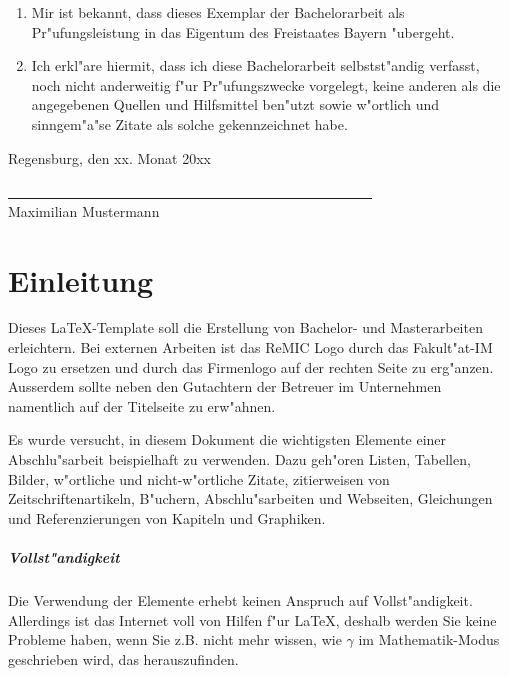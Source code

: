 \documentclass[12pt,a4paper,headinclude,twoside, plainheadsepline, open=right,numbers=noenddot]{scrreprt}
\begin{document}
\begin{enumerate}
\item Mir ist bekannt, dass dieses Exemplar der Bachelorarbeit als Pr"ufungsleistung in das Eigentum des Freistaates Bayern "ubergeht.
\item Ich erkl"are hiermit, dass ich diese Bachelorarbeit selbstst"andig verfasst, noch nicht anderweitig f"ur Pr"ufungszwecke vorgelegt, keine anderen als die angegebenen Quellen und Hilfsmittel ben"utzt sowie w"ortlich und sinngem"a"se Zitate als solche gekennzeichnet habe.
\end{enumerate}
\vspace{1cm}
Regensburg, den xx. Monat 20xx\\
\medskip
\medskip

\underline{~~~~~~~~~~~~~~~~~~~~~~~~~~~~~~~~~~~~~~~~~~~~~~~~~~~~}\\
Maximilian Mustermann\\




\pagestyle{useheadings} %

\tableofcontents %


\chapter{Einleitung}
\label{einleitung}

Dieses \LaTeX-Template soll die Erstellung von Bachelor- und Masterarbeiten erleichtern.
Bei externen Arbeiten ist das ReMIC Logo durch das Fakult"at-IM Logo zu ersetzen und durch das Firmenlogo auf der rechten Seite zu erg"anzen.
Ausserdem sollte neben den Gutachtern der Betreuer im Unternehmen namentlich auf der Titelseite zu erw"ahnen.

Es wurde versucht, in diesem Dokument die wichtigsten Elemente einer Abschlu"sarbeit beispielhaft zu verwenden.
Dazu geh"oren Listen, Tabellen, Bilder, w"ortliche und nicht-w"ortliche Zitate, zitierweisen von Zeitschriftenartikeln, B"uchern, Abschlu"sarbeiten und Webseiten, Gleichungen und Referenzierungen von Kapiteln und Graphiken.

\paragraph{Vollst"andigkeit}
Die Verwendung der Elemente erhebt keinen Anspruch auf Vollst"andigkeit.
Allerdings ist das Internet voll von Hilfen f"ur \LaTeX, deshalb werden Sie keine Probleme haben, wenn Sie z.B. nicht mehr wissen, wie $\gamma$ im Mathematik-Modus geschrieben wird, das herauszufinden.
\end{document}
